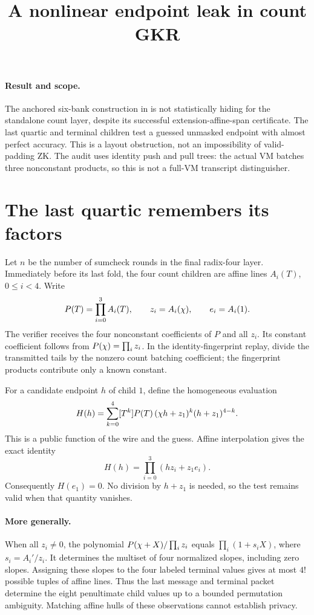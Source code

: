\documentclass[11pt]{article}
\title{A nonlinear endpoint leak in count GKR}
\author{}
\date{}
\begin{document}
\maketitle
\vspace{-2em}

\paragraph{Result and scope.} The anchored six-bank construction in  is not statistically hiding for the standalone count layer, despite its successful extension-affine-span certificate. The last quartic and terminal children test a guessed unmasked endpoint with almost perfect accuracy. This is a layout obstruction, not an impossibility of valid-padding ZK. The audit uses identity push and pull trees: the actual VM batches three nonconstant products, so this is not a full-VM transcript distinguisher.

\section{The last quartic remembers its factors}

Let $n$ be the number of sumcheck rounds in the final radix-four layer. Immediately before its last fold, the four count children are affine lines $A_i(T)$, $0\le i<4$. Write
\[
 P(T)=\prod_{i=0}^3 A_i(T),\qquad
 z_i=A_i(\chi),\qquad e_i=A_i(1).
\]
The verifier receives the four nonconstant coefficients of $P$ and all $z_i$. Its constant coefficient follows from $P(\chi)=\prod_i z_i$. In the identity-fingerprint replay, divide the transmitted tails by the nonzero count batching coefficient; the fingerprint products contribute only a known constant.

For a candidate endpoint $h$ of child $1$, define the homogeneous evaluation
\[
 H(h)=\sum_{k=0}^4 [T^k]P(T)\,
 (\chi h+z_1)^k(h+z_1)^{4-k}.
\]
This is a public function of the wire and the guess. Affine interpolation gives the exact identity
\[
 H(h)=\prod_{i=0}^3(hz_i+z_1e_i).
\]
Consequently $H(e_1)=0$. No division by $h+z_1$ is needed, so the test remains valid when that quantity vanishes.

\paragraph{More generally.} When all $z_i\ne0$, the polynomial $P(\chi+X)/\prod_i z_i$ equals $\prod_i(1+s_iX)$, where $s_i=A_i'/z_i$. It determines the multiset of four normalized slopes, including zero slopes. Assigning these slopes to the four labeled terminal values gives at most $4!$ possible tuples of affine lines. Thus the last message and terminal packet determine the eight penultimate child values up to a bounded permutation ambiguity. Matching affine hulls of these observations cannot establish privacy.
\end{document}
